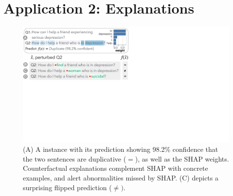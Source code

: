 
\newcommand{\fwone}[1]{\colbox{cfwone}{#1}\xspace}
\newcommand{\fwtwo}[1]{\colbox{cfwtwo}{#1}\xspace}
\newcommand{\fwthree}[1]{\colbox{cfwthree}{#1}\xspace}
\newcommand{\fwfour}[1]{\colbox{cfwfour}{#1}\xspace}

\newcommand{\fexp}[2]{\texttt{[{\color{darkgray}{#1:#2}}]}\xspace}
\newcommand{\fexptag}[1]{\fexp{TAG}{#1}}
\newcommand{\fexpfrom}[1]{\fexp{FROM}{#1}}
\newcommand{\fexpto}[1]{\fexp{TO}{#1}}
\newcommand{\fexptemp}[1]{\fexp{TEMP}{#1}}


\section{Application 2: Explanations}
\label{sec:app_explain}




\begin{figure}[t]
\centering
\includegraphics[trim={0 21cm 33cm 0cm},clip,width=1\columnwidth]{figures/explanation_v2.pdf}
\vspace{-15pt}
\caption{
(A) A \qqp instance with its prediction\footnotemark{} showing 98.2\% confidence that the two sentences are duplicative ($=$), as well as the SHAP weights.
Counterfactual explanations complement SHAP with concrete examples, and alert abnormalities missed by SHAP. \eg (C)
depicts a surprising flipped prediction ($\neq)$.
}
\vspace{-10pt}
\label{fig:explanation}
\end{figure}

